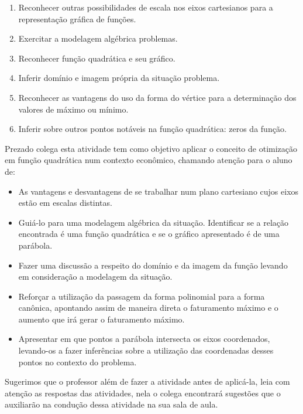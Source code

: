\documentclass[10 pt,usenames,dvipsnames, oneside]{article}
\begin{document}
\begin{goals}
\begin{enumerate}
\item Reconhecer outras possibilidades de escala nos eixos
cartesianos para a representação gráfica de funções.
\item Exercitar a modelagem algébrica problemas.
\item Reconhecer função quadrática e seu gráfico.
\item Inferir domínio e imagem própria da situação problema.
\item Reconhecer as vantagens do uso da forma do vértice para a determinação dos valores de máximo ou mínimo.
\item Inferir sobre outros pontos notáveis na função quadrática: zeros da função.
\end{enumerate}


\tcblower
Prezado colega esta atividade tem como objetivo aplicar o conceito de otimização em função quadrática num contexto econômico, chamando atenção para o aluno de:

\begin{itemize}
\item As vantagens e desvantagens de se trabalhar num plano cartesiano cujos eixos estão em escalas distintas.
\item Guiá-lo para uma modelagem algébrica da situação.
Identificar se a relação encontrada é uma função quadrática e se o gráfico apresentado é de uma parábola.
\item Fazer uma discussão a respeito do domínio e da imagem da função levando em consideração a modelagem da situação.
\item Reforçar a utilização da passagem da forma polinomial para a forma canônica, apontando assim de maneira direta o faturamento máximo e o aumento que irá gerar o faturamento máximo.
\item Apresentar em que pontos a parábola intersecta os eixos coordenados, levando-os a fazer inferências sobre a utilização das coordenadas desses pontos no contexto do problema.
\end{itemize}


Sugerimos que o professor além de fazer a atividade antes de aplicá-la, leia com atenção as respostas das atividades, nela o colega encontrará sugestões que o auxiliarão na condução dessa atividade na sua sala de aula.
\end{goals}
\end{document}
